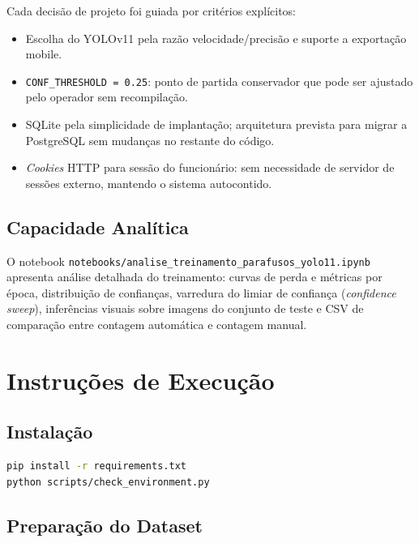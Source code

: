 \documentclass[12pt,a4paper]{article}
\begin{document}
Cada decis\~ao de projeto foi guiada por crit\'erios expl\'icitos:
\begin{itemize}[leftmargin=*]
  \item Escolha do YOLOv11 pela raz\~ao velocidade/precis\~ao e suporte a exporta\c{c}\~ao mobile.
  \item \texttt{CONF\_THRESHOLD = 0.25}: ponto de partida conservador que pode ser
        ajustado pelo operador sem recompila\c{c}\~ao.
  \item SQLite pela simplicidade de implanta\c{c}\~ao; arquitetura prevista para migrar
        a PostgreSQL sem mudan\c{c}as no restante do c\'odigo.
  \item \emph{Cookies} HTTP para sess\~ao do funcion\'ario: sem necessidade de servidor de
        sess\~oes externo, mantendo o sistema autocontido.
\end{itemize}

\subsection{Capacidade Anal\'itica}

O notebook \texttt{notebooks/analise\_treinamento\_parafusos\_yolo11.ipynb} apresenta
an\'alise detalhada do treinamento: curvas de perda e m\'etricas por \'epoca, distribui\c{c}\~ao
de confian\c{c}as, varredura do limiar de confian\c{c}a (\emph{confidence sweep}),
inferências visuais sobre imagens do conjunto de teste e CSV de compara\c{c}\~ao entre
contagem autom\'atica e contagem manual.

\section{Instru\c{c}\~oes de Execu\c{c}\~ao}

\subsection{Instala\c{c}\~ao}

\begin{lstlisting}[language=bash, caption={Instala\c{c}\~ao das depend\^encias}]
pip install -r requirements.txt
python scripts/check_environment.py
\end{lstlisting}

\subsection{Prepara\c{c}\~ao do Dataset}
\end{document}
